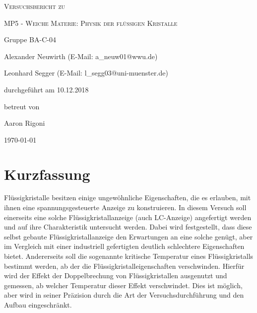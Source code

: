 \documentclass[
	a4paper,
	12pt,
	pagesize,
	ngerman
]{scrartcl}
\begin{document}
	\begin{titlepage}
		\centering
		{\scshape\LARGE Versuchsbericht zu \par}
		\vspace{1cm}
		{\scshape\huge MP5 - Weiche Materie: Physik der
flüssigen Kristalle \par} %
		\vspace{2.5cm}
		{\LARGE Gruppe BA-C-04 \par}
		\vspace{0.5cm}

		{\large Alexander Neuwirth (E-Mail: a\_neuw01@wwu.de) \par}
		{\large Leonhard Segger (E-Mail: l\_segg03@uni-muenster.de) \par}
		\vfill

		durchgeführt am 10.12.2018\par
		betreut von\par
		{\large Aaron Rigoni}

		\vfill

		{\large \today\par}
	\end{titlepage}
	\tableofcontents
	\newpage


	\section{Kurzfassung}
	Flüssigkristalle besitzen einige ungewöhnliche Eigenschaften, die es erlauben, mit ihnen eine spannungsgesteuerte Anzeige zu konstruieren.
	In diesem Versuch soll einerseits eine solche Flüssigkristallanzeige (auch LC-Anzeige) angefertigt werden und auf ihre Charakteristik untersucht werden.
	Dabei wird festgestellt, dass diese selbst gebaute Flüssigkristallanzeige den Erwartungen an eine solche genügt, aber im Vergleich mit einer industriell gefertigten deutlich schlechtere Eigenschaften bietet.
	Andererseits soll die sogenannte kritische Temperatur eines Flüssigkristalls bestimmt werden, ab der die Flüssigkristalleigenschaften verschwinden.
	Hierfür wird der Effekt der Doppelbrechung von Flüssigkristallen ausgenutzt und gemessen, ab welcher Temperatur dieser Effekt verschwindet.
	Dies ist möglich, aber wird in seiner Präzision durch die Art der Versuchsdurchführung und den Aufbau eingeschränkt.
\end{document}
